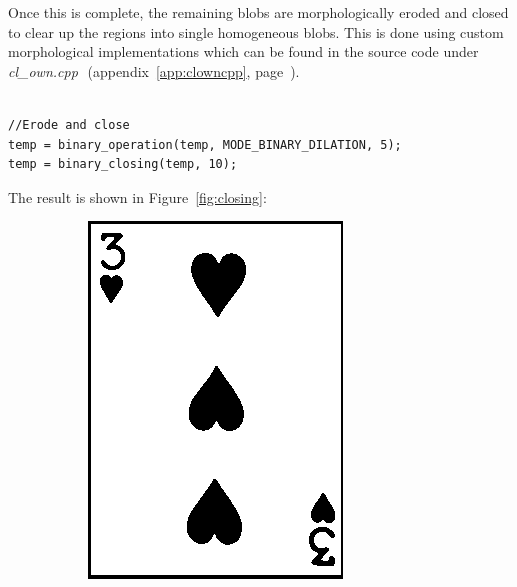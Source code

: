 \documentclass[a4paper,12pt,notitlepage]{article}
\newcommand{\source}[2]{\emph{#1 } (appendix~\ref{#2}, page~\pageref{#2})}
\begin{document}
			Once this is complete, the remaining blobs are morphologically eroded and closed to clear up the regions into single homogeneous blobs. This is done using custom morphological implementations which can be found in the source code under \source{cl\_own.cpp}{app:clowncpp}.

			\begin{lstlisting}

//Erode and close
temp = binary_operation(temp, MODE_BINARY_DILATION, 5);
temp = binary_closing(temp, 10);
			\end{lstlisting}

			The result is shown in Figure~\ref{fig:closing}:

			\begin{figure}[H]
				\centering
				\begin{subfigure}[b]{0.4\textwidth}
					\centering
					\includegraphics[width=\textwidth]{chris/image20}

\end{subfigure}
\end{figure}
\end{document}
